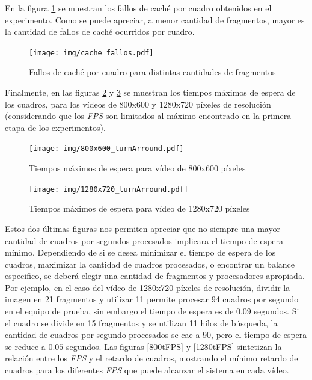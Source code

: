 En la figura \ref{cacheFallos} se muestran los fallos de caché por cuadro
obtenidos en el experimento. Como se puede apreciar, a menor cantidad de
fragmentos, mayor es la cantidad de fallos de caché ocurridos por cuadro.

\begin{figure}[!h]

	\texttt{[image: img/cache\_fallos.pdf]}
	\caption{Fallos de caché por cuadro para distintas cantidades de
	fragmentos}
	\label{cacheFallos}

\end{figure}

Finalmente, en las figuras \ref{800turnArround} y \ref{1280turnArround} se
muestran los tiempos máximos de espera de los cuadros, para los vídeos de
800x600 y 1280x720 píxeles de resolución (considerando que los \emph{FPS} son
limitados al máximo encontrado en la primera etapa de los experimentos).

\begin{figure}[!h]

	\texttt{[image: img/800x600\_turnArround.pdf]}
	\caption{Tiempos máximos de espera para vídeo de 800x600 píxeles}
	\label{800turnArround}

\end{figure}


\begin{figure}[!h]

	\texttt{[image: img/1280x720\_turnArround.pdf]}
	\caption{Tiempos máximos de espera para vídeo de 1280x720 píxeles}
	\label{1280turnArround}

\end{figure}

Estos dos últimas figuras nos permiten apreciar que no siempre una mayor
cantidad de cuadros por segundos procesados implicara el tiempo de espera
mínimo. Dependiendo de si se desea minimizar el tiempo de espera de los cuadros,
maximizar la cantidad de cuadros procesados, o encontrar un balance especifico,
se deberá elegir una cantidad de fragmentos y procesadores apropiada. Por
ejemplo, en el caso del vídeo de 1280x720 píxeles de resolución, dividir la
imagen en 21 fragmentos y utilizar 11 permite procesar 94 cuadros por segundo en
el equipo de prueba, sin embargo el tiempo de espera es de $0.09$ segundos. Si
el cuadro se divide en 15 fragmentos y se utilizan 11 hilos de búsqueda, la
cantidad de cuadros por segundo procesados se cae a 90, pero el tiempo de espera
se reduce a $0.05$ segundos. Las figuras \ref{800tFPS} y \ref{1280tFPS}
sintetizan la relación entre los \emph{FPS} y el retardo de cuadros, mostrando
el mínimo retardo de cuadros para los diferentes \emph{FPS} que puede alcanzar
el sistema en cada vídeo.

